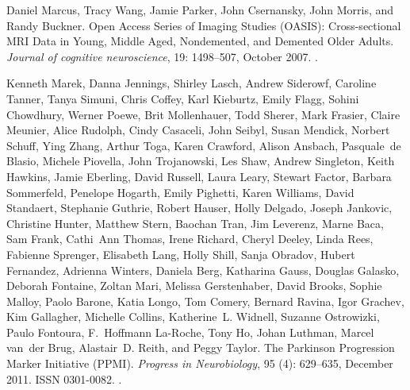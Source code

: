 \documentclass{midl}
\begin{document}
\begin{thebibliography}{50}
Daniel Marcus, Tracy Wang, Jamie Parker, John Csernansky, John Morris, and
  Randy Buckner.
\newblock Open {Access} {Series} of {Imaging} {Studies} ({OASIS}):
  {Cross}-sectional {MRI} {Data} in {Young}, {Middle} {Aged}, {Nondemented},
  and {Demented} {Older} {Adults}.
\newblock \emph{Journal of cognitive neuroscience}, 19: 1498--507,
  October 2007.
\newblock {}.

Kenneth Marek, Danna Jennings, Shirley Lasch, Andrew Siderowf, Caroline Tanner,
  Tanya Simuni, Chris Coffey, Karl Kieburtz, Emily Flagg, Sohini Chowdhury,
  Werner Poewe, Brit Mollenhauer, Todd Sherer, Mark Frasier, Claire Meunier,
  Alice Rudolph, Cindy Casaceli, John Seibyl, Susan Mendick, Norbert Schuff,
  Ying Zhang, Arthur Toga, Karen Crawford, Alison Ansbach, Pasquale~de Blasio,
  Michele Piovella, John Trojanowski, Les Shaw, Andrew Singleton, Keith
  Hawkins, Jamie Eberling, David Russell, Laura Leary, Stewart Factor, Barbara
  Sommerfeld, Penelope Hogarth, Emily Pighetti, Karen Williams, David
  Standaert, Stephanie Guthrie, Robert Hauser, Holly Delgado, Joseph Jankovic,
  Christine Hunter, Matthew Stern, Baochan Tran, Jim Leverenz, Marne Baca, Sam
  Frank, Cathi~Ann Thomas, Irene Richard, Cheryl Deeley, Linda Rees, Fabienne
  Sprenger, Elisabeth Lang, Holly Shill, Sanja Obradov, Hubert Fernandez,
  Adrienna Winters, Daniela Berg, Katharina Gauss, Douglas Galasko, Deborah
  Fontaine, Zoltan Mari, Melissa Gerstenhaber, David Brooks, Sophie Malloy,
  Paolo Barone, Katia Longo, Tom Comery, Bernard Ravina, Igor Grachev, Kim
  Gallagher, Michelle Collins, Katherine~L. Widnell, Suzanne Ostrowizki, Paulo
  Fontoura, F.~Hoffmann La-Roche, Tony Ho, Johan Luthman, Marcel van~der Brug,
  Alastair~D. Reith, and Peggy Taylor.
\newblock The {Parkinson} {Progression} {Marker} {Initiative} ({PPMI}).
\newblock \emph{Progress in Neurobiology}, 95 (4): 629--635,
  December 2011.
\newblock ISSN 0301-0082.
\newblock {}.


\end{thebibliography}
\end{document}
